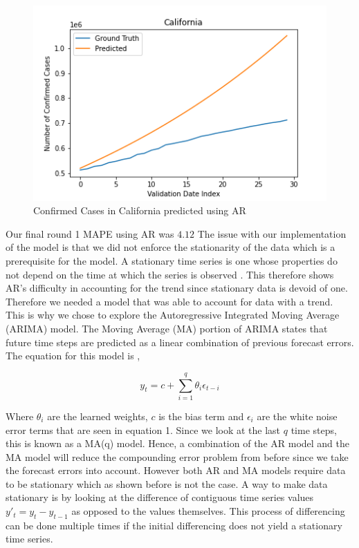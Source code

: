 \documentclass[sigconf,nonacm]{acmart}
\begin{document}
\begin{figure}
  \includegraphics[width=\linewidth]{./figures/Section2_AR_Cali_Conf.png}
  \caption{Confirmed Cases in California predicted using AR}
  \label{fig:AR}
\end{figure} 

Our final round 1 MAPE using AR was $4.12$ The issue with our implementation of
the model is that we did not enforce the stationarity of the data which is a
prerequisite for the model. A stationary time series is one whose properties do
not depend on the time at which the series is observed \cite{forecasting}. This
therefore shows AR's difficulty in accounting for the trend since stationary
data is devoid of one. Therefore we needed a model that was able to account for
data with a trend. This is why we chose to explore the Autoregressive
Integrated Moving Average (ARIMA) model. The Moving Average (MA) portion of
ARIMA states that future time steps are predicted as a linear combination of
previous forecast errors. The equation for this model is \cite{forecasting},

\begin{equation}
y_t = c + \sum_{i=1}^{q} \theta_i \epsilon_{t-i}
\end{equation} 

Where $\theta_i$ are the learned weights, $c$ is the bias term and $\epsilon_i$
are the white noise error terms that are seen in equation 1. Since we look at
the last $q$ time steps, this is known as a MA(q) model. Hence, a combination
of the AR model and the MA model will reduce the compounding error problem from
before since we take the forecast errors into account. However both AR and MA
models require data to be stationary which as shown before is not the case. A
way to make data stationary is by looking at the difference of contiguous time
series values $y'_t = y_t - y_{t-1}$ as opposed to the values themselves. This
process of differencing can be done multiple times if the initial differencing
does not yield a stationary time series.
\end{document}
